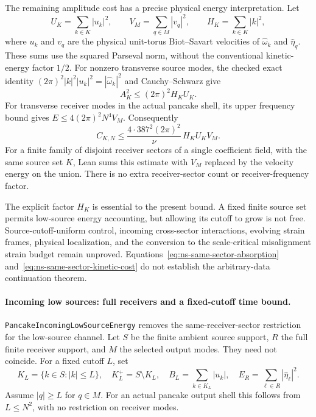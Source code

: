 \documentclass[11pt]{article}
\theoremstyle{definition}
\begin{document}
The remaining amplitude cost has a precise physical energy interpretation.
Let
\[
 U_K=\sum_{k\in K}|u_k|^2,\qquad
 V_M=\sum_{q\in M}|v_q|^2,\qquad
 H_K=\sum_{k\in K}|k|^2,
\]
where $u_k$ and $v_q$ are the physical unit-torus Biot--Savart velocities
of $\widehat\omega_k$ and $\widehat\eta_q$.  These sums use the squared
Parseval norm, without the conventional kinetic-energy factor $1/2$.
For nonzero transverse source modes, the checked exact identity
$(2\pi)^2|k|^2|u_k|^2=|\widehat\omega_k|^2$ and Cauchy--Schwarz give
\[
 A_K^2\le(2\pi)^2H_KU_K.
\]
For transverse receiver modes in the actual pancake shell, its upper
frequency bound gives $E\le4(2\pi)^2N^4V_M$.  Consequently
\begin{equation}\label{eq:ns-same-sector-kinetic-cost}
 C_{K,N}\le\frac{4\cdot387^2(2\pi)^2}{\nu}\,H_KU_KV_M.
\end{equation}
For a finite family of disjoint receiver sectors of a single coefficient
field, with the same source set $K$, Lean sums this estimate with $V_M$
replaced by the velocity energy on the union.  There is no extra
receiver-sector count or receiver-frequency factor.

The explicit factor $H_K$ is essential to the present bound.  A fixed
finite source set permits low-source energy accounting, but allowing its
cutoff to grow is not free.  Source-cutoff-uniform control, incoming
cross-sector interactions, evolving strain frames, physical localization,
and the conversion to the scale-critical misalignment strain budget remain
unproved.  Equations~\eqref{eq:ns-same-sector-absorption}
and~\eqref{eq:ns-same-sector-kinetic-cost} do not establish the
arbitrary-data continuation theorem.

\paragraph{Incoming low sources: full receivers and a fixed-cutoff time bound.}
\texttt{PancakeIncomingLowSourceEnergy} removes the same-receiver-sector
restriction for the low-source channel.  Let $S$ be the finite ambient
source support, $R$ the full finite receiver support, and $M$ the selected
output modes.  They need not coincide.  For a fixed cutoff $L$, set
\[
 K_L=\{k\in S:|k|\le L\},\quad K_L^+=S\setminus K_L,
 \quad B_L=\sum_{k\in K_L}|u_k|,\quad
 E_R=\sum_{\ell\in R}|\widehat\eta_\ell|^2.
\]
Assume $|q|\ge L$ for $q\in M$.  For an actual pancake output shell this
follows from $L\le N^2$, with no restriction on receiver modes.
\end{document}
